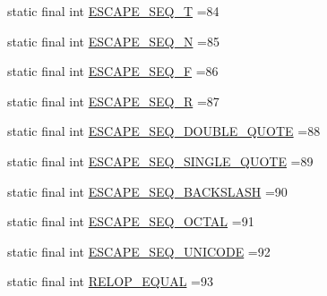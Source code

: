 \begin{DoxyCompactItemize}
\item 
static final int \hyperlink{classgov_1_1nasa_1_1jpf_1_1inspector_1_1server_1_1expression_1_1parser_1_1_expression_grammar_parser_a3b170973ca7413938d7db332e5241d16}{E\+S\+C\+A\+P\+E\+\_\+\+S\+E\+Q\+\_\+T} =84
\item 
static final int \hyperlink{classgov_1_1nasa_1_1jpf_1_1inspector_1_1server_1_1expression_1_1parser_1_1_expression_grammar_parser_ada65cacc5b2d55d10123b0df5445f8ca}{E\+S\+C\+A\+P\+E\+\_\+\+S\+E\+Q\+\_\+N} =85
\item 
static final int \hyperlink{classgov_1_1nasa_1_1jpf_1_1inspector_1_1server_1_1expression_1_1parser_1_1_expression_grammar_parser_acc8f66f132a363b7ca6ea78d13127477}{E\+S\+C\+A\+P\+E\+\_\+\+S\+E\+Q\+\_\+F} =86
\item 
static final int \hyperlink{classgov_1_1nasa_1_1jpf_1_1inspector_1_1server_1_1expression_1_1parser_1_1_expression_grammar_parser_a60b59cc3de3c9517777cf9d943bbf1af}{E\+S\+C\+A\+P\+E\+\_\+\+S\+E\+Q\+\_\+R} =87
\item 
static final int \hyperlink{classgov_1_1nasa_1_1jpf_1_1inspector_1_1server_1_1expression_1_1parser_1_1_expression_grammar_parser_abb567581783847812c86831365d8f580}{E\+S\+C\+A\+P\+E\+\_\+\+S\+E\+Q\+\_\+\+D\+O\+U\+B\+L\+E\+\_\+\+Q\+U\+O\+TE} =88
\item 
static final int \hyperlink{classgov_1_1nasa_1_1jpf_1_1inspector_1_1server_1_1expression_1_1parser_1_1_expression_grammar_parser_a9ff6967a2c57076643b03b0d09069c60}{E\+S\+C\+A\+P\+E\+\_\+\+S\+E\+Q\+\_\+\+S\+I\+N\+G\+L\+E\+\_\+\+Q\+U\+O\+TE} =89
\item 
static final int \hyperlink{classgov_1_1nasa_1_1jpf_1_1inspector_1_1server_1_1expression_1_1parser_1_1_expression_grammar_parser_ac71e949b36bdaf43df235fa65eca61f5}{E\+S\+C\+A\+P\+E\+\_\+\+S\+E\+Q\+\_\+\+B\+A\+C\+K\+S\+L\+A\+SH} =90
\item 
static final int \hyperlink{classgov_1_1nasa_1_1jpf_1_1inspector_1_1server_1_1expression_1_1parser_1_1_expression_grammar_parser_a09add7cf37fcb080e6bf3ebd67cf5b6a}{E\+S\+C\+A\+P\+E\+\_\+\+S\+E\+Q\+\_\+\+O\+C\+T\+AL} =91
\item 
static final int \hyperlink{classgov_1_1nasa_1_1jpf_1_1inspector_1_1server_1_1expression_1_1parser_1_1_expression_grammar_parser_a4df01726f95dda525b6d4de4dad34af7}{E\+S\+C\+A\+P\+E\+\_\+\+S\+E\+Q\+\_\+\+U\+N\+I\+C\+O\+DE} =92
\item 
static final int \hyperlink{classgov_1_1nasa_1_1jpf_1_1inspector_1_1server_1_1expression_1_1parser_1_1_expression_grammar_parser_afa41654dabc6ce36677bf24d5f21f9fd}{R\+E\+L\+O\+P\+\_\+\+E\+Q\+U\+AL} =93

\end{DoxyCompactItemize}
